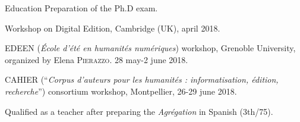 \begin{rubric}{Education}
                                \entry*[2017-2018]
                            Preparation of the Ph.D exam.
                    
                                \entry*
                            Workshop on Digital Edition, Cambridge (UK), april 2018.
                    
                                 EDEEN (\textit{École d'été en humanités numériques}) workshop,
                        Grenoble University, organized by Elena \textsc{Pierazzo}. 28
                        may-2 june 2018.
                    
                                 CAHIER (\enquote{\textit{Corpus d’auteurs pour les humanités :
                        informatisation, édition, recherche}}) consortium workshop,
                        Montpellier, 26-29 june 2018.
                    
                                \entry*[2016-2017]
                            Qualified as a teacher after preparing the \textit{Agrégation} in
                        Spanish (3th/75).
                    

\end{rubric}

